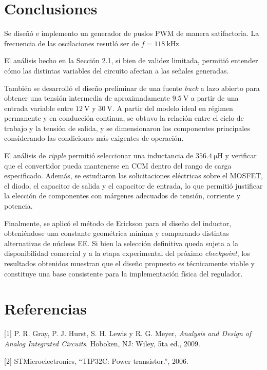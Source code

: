 \documentclass[a4paper,12pt]{article}
\begin{document}
\section{Conclusiones}

Se diseñó e implemento un generador de puslos PWM de manera satifactoria. La frecuencia de las oscilaciones resutló ser de $f = \SI{118}{\kilo \hertz}$.

El análisis hecho en la Sección 2.1, si bien de validez limitada, permitió entender cómo las distintas variables del circuito afectan a las señales generadas. 

También se desarrolló el diseño preliminar de una fuente \textit{buck} a lazo abierto para obtener una tensión intermedia de aproximadamente $\SI{9.5}{\volt}$ a partir de una entrada variable entre $\SI{12}{\volt}$ y $\SI{30}{\volt}$. A partir del modelo ideal en régimen permanente y en conducción continua, se obtuvo la relación entre el ciclo de trabajo y la tensión de salida, y se dimensionaron los componentes principales considerando las condiciones más exigentes de operación.

El análisis de \textit{ripple} permitió seleccionar una inductancia de $\SI{356.4}{\micro\henry}$ y verificar que el convertidor pueda mantenerse en CCM dentro del rango de carga especificado. Además, se estudiaron las solicitaciones eléctricas sobre el MOSFET, el diodo, el capacitor de salida y el capacitor de entrada, lo que permitió justificar la elección de componentes con márgenes adecuados de tensión, corriente y potencia.

Finalmente, se aplicó el método de Erickson para el diseño del inductor, obteniéndose una constante geométrica mínima y comparando distintas alternativas de núcleos EE. Si bien la selección definitiva queda sujeta a la disponibilidad comercial y a la etapa experimental del próximo \textit{checkpoint}, los resultados obtenidos muestran que el diseño propuesto es técnicamente viable y constituye una base consistente para la implementación física del regulador.


\section{Referencias}

[1] P. R. Gray, P. J. Hurst, S. H. Lewis y R. G. Meyer, \textit{Analysis and Design of Analog Integrated Circuits}. Hoboken, NJ: Wiley, 5ta ed., 2009.

[2] STMicroelectronics, ``TIP32C: Power transistor.'', 2006.
\end{document}
